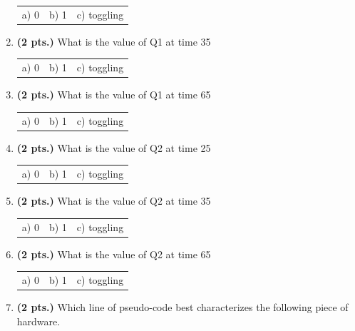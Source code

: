 \documentclass{article}
\begin{document}
\begin{enumerate}
\begin{tabular}{p{0.75in}p{0.75in}p{1.75in}}
a) 0 & b) 1 & c) toggling \\
\end{tabular}

\item {\bf (2 pts.)} What is the value of Q1 at time 35

\begin{tabular}{p{0.75in}p{0.75in}p{1.75in}}
a) 0 & b) 1 & c) toggling \\
\end{tabular}

\item {\bf (2 pts.)} What is the value of Q1 at time 65

\begin{tabular}{p{0.75in}p{0.75in}p{1.75in}}
a) 0 & b) 1 & c) toggling \\
\end{tabular}

\item {\bf (2 pts.)} What is the value of Q2 at time 25

\begin{tabular}{p{0.75in}p{0.75in}p{1.75in}}
a) 0 & b) 1 & c) toggling \\
\end{tabular}

\item {\bf (2 pts.)} What is the value of Q2 at time 35

\begin{tabular}{p{0.75in}p{0.75in}p{1.75in}}
a) 0 & b) 1 & c) toggling \\
\end{tabular}

\item {\bf (2 pts.)} What is the value of Q2 at time 65

\begin{tabular}{p{0.75in}p{0.75in}p{1.75in}}
a) 0 & b) 1 & c) toggling \\
\end{tabular}

\pagebreak

\item {\bf (2 pts.)} Which line of pseudo-code best characterizes
the following piece of hardware.



\end{enumerate}
\end{document}
